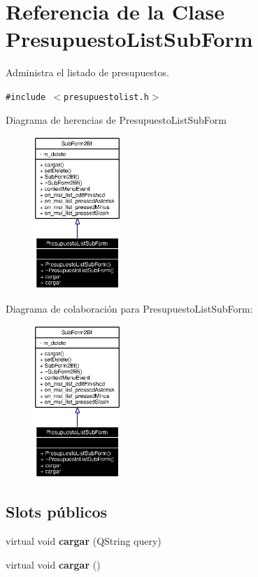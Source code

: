 \section{Referencia de la Clase Presupuesto\-List\-Sub\-Form}
\label{classPresupuestoListSubForm}
Administra el listado de presupuestos.  


{\tt \#include $<$presupuestolist.h$>$}

Diagrama de herencias de Presupuesto\-List\-Sub\-Form\begin{figure}[H]
\begin{center}
\leavevmode
\includegraphics[width=94pt]{classPresupuestoListSubForm__inherit__graph}
\end{center}
\end{figure}
Diagrama de colaboraci\'{o}n para Presupuesto\-List\-Sub\-Form:\begin{figure}[H]
\begin{center}
\leavevmode
\includegraphics[width=94pt]{classPresupuestoListSubForm__coll__graph}
\end{center}
\end{figure}
\subsection*{Slots p\'{u}blicos}
\begin{CompactItemize}
\item 
virtual void {\bf cargar} (QString query)\label{classPresupuestoListSubForm_i0}

\item 
virtual void {\bf cargar} ()\label{classPresupuestoListSubForm_i1}

\end{CompactItemize}
